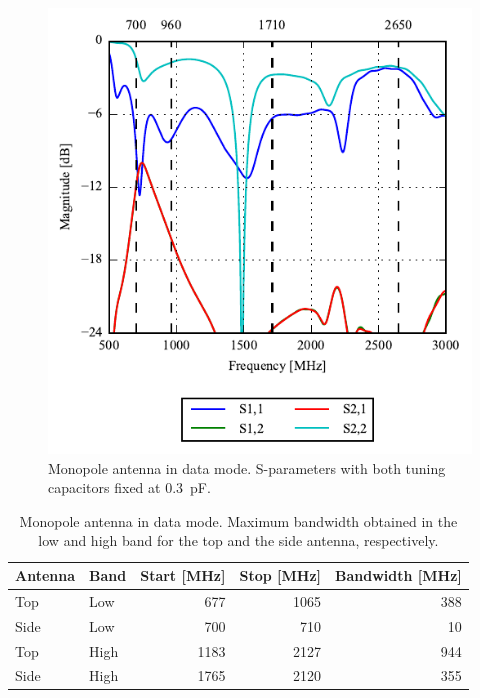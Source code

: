 \begin{figure}[htbp]
    \centering
    \includegraphics{img/tech_sol/monopole/data_mode/sparam_data.pdf}
    \caption{Monopole antenna in data mode. S-parameters with both tuning capacitors fixed at \SI{0.3}{pF}.}
    \label{fig:mono_sparam_data}
\end{figure}

\begin{table}[htbp]
  \centering
  \begin{tabular}{|l|l|r|r|r|}
    \hline
    Antenna & Band & Start [MHz] & Stop [MHz] & Bandwidth [MHz] \\
    \hline
    Top     & Low  &  677  & 1065  & 388 \\
    Side    & Low  &  700  & 710  & 10  \\
    \hline
    Top     & High &  1183 &  2127  & 944 \\
    Side    & High & 1765 &  2120 & 355 \\
    \hline
  \end{tabular}
  \caption{Monopole antenna in data mode. Maximum bandwidth obtained in the low and high band for the top and the side antenna, respectively.}    
  \label{tab:bw_sol1data}
\end{table}

